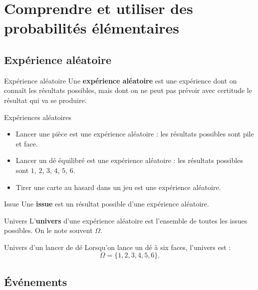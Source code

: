 \documentclass[11pt,a4paper]{article}
\begin{document}
\newpage

\section{Comprendre et utiliser des probabilités élémentaires}

\subsection{Expérience aléatoire}

\begin{definitionbox}{Expérience aléatoire}
Une \textbf{expérience aléatoire} est une expérience dont on connaît les résultats possibles, mais dont on ne peut pas prévoir avec certitude le résultat qui va se produire.
\end{definitionbox}

\begin{examplebox}{Expériences aléatoires}
\begin{itemize}
    \item Lancer une pièce est une expérience aléatoire : les résultats possibles sont pile et face.
    \item Lancer un dé équilibré est une expérience aléatoire : les résultats possibles sont $1$, $2$, $3$, $4$, $5$, $6$.
    \item Tirer une carte au hasard dans un jeu est une expérience aléatoire.
\end{itemize}
\end{examplebox}

\begin{definitionbox}{Issue}
Une \textbf{issue} est un résultat possible d'une expérience aléatoire.
\end{definitionbox}

\begin{definitionbox}{Univers}
L'\textbf{univers} d'une expérience aléatoire est l'ensemble de toutes les issues possibles. On le note souvent $\Omega$.
\end{definitionbox}

\begin{examplebox}{Univers d'un lancer de dé}
Lorsqu'on lance un dé à six faces, l'univers est :
\[
\Omega=\{1,2,3,4,5,6\}.
\]
\end{examplebox}

\subsection{Événements}
\end{document}
